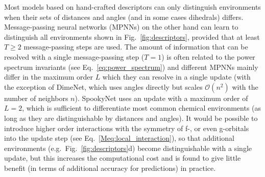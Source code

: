 \documentclass[%
superscriptaddress,
reprint,
nofootinbib,
amsmath,amssymb,amsfonts,
floatfix,
altaffilletter,
showkeys,
]{revtex4-2}
\newcommand{\nn}{SpookyNet}
\begin{document}
Most models based on hand-crafted descriptors can only distinguish environments when their sets of distances and angles (and in some cases dihedrals) differs. Message-passing neural networks (MPNNs) on the other hand can learn to distinguish all environments shown in Fig.~\ref{fig:descriptors}, provided that at least $T\geq2$ message-passing steps are used. The amount of information that can be resolved with a single message-passing step ($T=1$) is often related to the power spectrum invariants (see Eq.~\ref{eq:power_spectrum}) and different MPNNs mainly differ in the maximum order $L$ which they can resolve in a single update (with the exception of DimeNet,\cite{klicpera2020directional} which uses angles directly but scales $\mathcal{O}(n^2)$ with the number of neighbors $n$). \nn{} uses an update with a maximum order of $L=2$, which is sufficient to differentiate most common chemical environments (as long as they are distinguishable by distances and angles). It would be possible to introduce higher order interactions with the symmetry of f-, or even g-orbitals into the update step (see Eq.~\ref{Meq:local_interaction}), so that additional environments (e.g.\ Fig.~\ref{fig:descriptors}d) become distinguishable with a single update, but this increases the computational cost and is found to give little benefit (in terms of additional accuracy for predictions) in practice.\\

\end{document}
